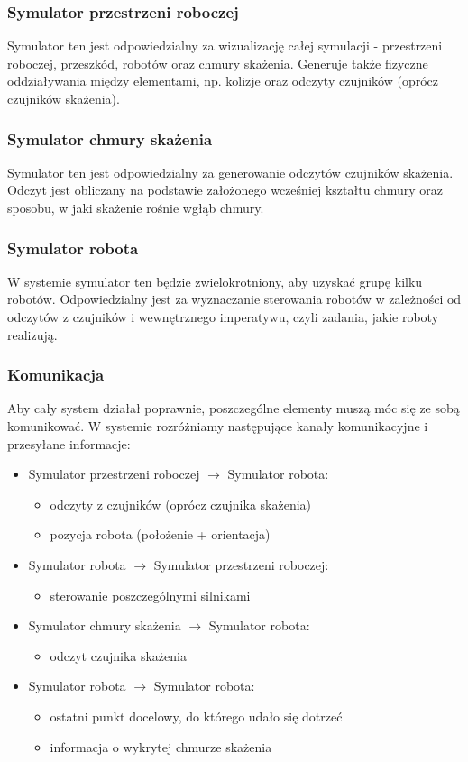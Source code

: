 \documentclass[a4paper, 12pt]{article}
\begin{document}
	\subsubsection{Symulator przestrzeni roboczej}
	Symulator ten jest odpowiedzialny za wizualizację całej symulacji - przestrzeni roboczej, przeszkód, robotów oraz chmury skażenia. Generuje także fizyczne oddziaływania między elementami, np. kolizje oraz odczyty czujników (oprócz czujników skażenia).
	
	\subsubsection{Symulator chmury skażenia}
	Symulator ten jest odpowiedzialny za generowanie odczytów czujników skażenia. Odczyt jest obliczany na podstawie założonego wcześniej kształtu chmury oraz sposobu, w jaki skażenie rośnie wgłąb chmury.
	
	\subsubsection{Symulator robota}
	W systemie symulator ten będzie zwielokrotniony, aby uzyskać grupę kilku robotów. Odpowiedzialny jest za wyznaczanie sterowania robotów w zależności od odczytów z czujników i wewnętrznego imperatywu, czyli zadania, jakie roboty realizują.
	
	\subsubsection{Komunikacja}
	Aby cały system działał poprawnie, poszczególne elementy muszą móc się ze sobą komunikować. W systemie rozróżniamy następujące kanały komunikacyjne i przesyłane informacje:
	\begin{itemize}
	\item Symulator przestrzeni roboczej $\rightarrow$ Symulator robota:
		\begin{itemize}
		\item odczyty z czujników (oprócz czujnika skażenia)
		\item pozycja robota (położenie + orientacja)	
		\end{itemize}
	\item Symulator robota $\rightarrow$ Symulator przestrzeni roboczej:
		\begin{itemize}
		\item sterowanie poszczególnymi silnikami
		\end{itemize}
	\item Symulator chmury skażenia $\rightarrow$ Symulator robota:
		\begin{itemize}
		\item odczyt czujnika skażenia
		\end{itemize}
	\item Symulator robota $\rightarrow$ Symulator robota:
		\begin{itemize}
		\item ostatni punkt docelowy, do którego udało się dotrzeć
		\item informacja o wykrytej chmurze skażenia
		\end{itemize}
	
	\end{itemize}
	
\end{document}
